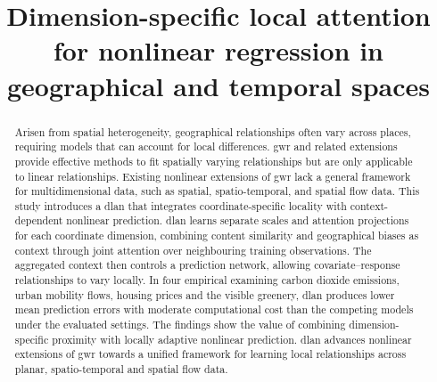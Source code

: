\documentclass[]{interact}
\newif\ifanonymous
\newcommand{\DLAN}{\gls{dlan}\xspace}
\begin{document}

\title{Dimension-specific local attention for nonlinear regression in geographical and temporal spaces}

\ifanonymous
\else
\author{
}
\fi

\maketitle

\begin{abstract}
Arisen from spatial heterogeneity, geographical relationships often vary across places, requiring models that can account for local differences.
\Gls{gwr} and related extensions provide effective methods to fit spatially varying relationships but are only applicable to linear relationships.
Existing nonlinear extensions of \gls{gwr} lack a general framework for multidimensional data, such as spatial, spatio-temporal, and spatial flow data.
This study introduces a \DLAN that integrates coordinate-specific locality with context-dependent nonlinear prediction.
\DLAN learns separate scales and attention projections for each coordinate dimension, combining content similarity and geographical biases as context through joint attention over neighbouring training observations.
The aggregated context then controls a prediction network, allowing covariate--response relationships to vary locally.
In four empirical examining carbon dioxide emissions, urban mobility flows, housing prices and the visible greenery, \DLAN produces lower mean prediction errors with moderate computational cost than the competing models under the evaluated settings.
The findings show the value of combining dimension-specific proximity with locally adaptive nonlinear prediction.
\DLAN advances nonlinear extensions of \gls{gwr} towards a unified framework for learning local relationships across planar, spatio-temporal and spatial flow data.
\end{abstract}
\end{document}
